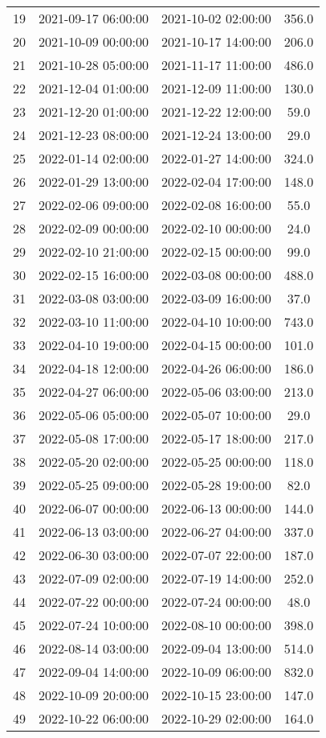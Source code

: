 \begin{center}
\begin{longtable}{|c|c|c|c|}
19 & 2021-09-17 06:00:00 & 2021-10-02 02:00:00 & 356.0\\ 
20 & 2021-10-09 00:00:00 & 2021-10-17 14:00:00 & 206.0\\ 
21 & 2021-10-28 05:00:00 & 2021-11-17 11:00:00 & 486.0\\ 
22 & 2021-12-04 01:00:00 & 2021-12-09 11:00:00 & 130.0\\ 
23 & 2021-12-20 01:00:00 & 2021-12-22 12:00:00 & 59.0\\ 
24 & 2021-12-23 08:00:00 & 2021-12-24 13:00:00 & 29.0\\ 
25 & 2022-01-14 02:00:00 & 2022-01-27 14:00:00 & 324.0\\ 
26 & 2022-01-29 13:00:00 & 2022-02-04 17:00:00 & 148.0\\ 
27 & 2022-02-06 09:00:00 & 2022-02-08 16:00:00 & 55.0\\ 
28 & 2022-02-09 00:00:00 & 2022-02-10 00:00:00 & 24.0\\ 
29 & 2022-02-10 21:00:00 & 2022-02-15 00:00:00 & 99.0\\ 
30 & 2022-02-15 16:00:00 & 2022-03-08 00:00:00 & 488.0\\ 
31 & 2022-03-08 03:00:00 & 2022-03-09 16:00:00 & 37.0\\ 
32 & 2022-03-10 11:00:00 & 2022-04-10 10:00:00 & 743.0\\ 
33 & 2022-04-10 19:00:00 & 2022-04-15 00:00:00 & 101.0\\ 
34 & 2022-04-18 12:00:00 & 2022-04-26 06:00:00 & 186.0\\ 
35 & 2022-04-27 06:00:00 & 2022-05-06 03:00:00 & 213.0\\ 
36 & 2022-05-06 05:00:00 & 2022-05-07 10:00:00 & 29.0\\ 
37 & 2022-05-08 17:00:00 & 2022-05-17 18:00:00 & 217.0\\ 
38 & 2022-05-20 02:00:00 & 2022-05-25 00:00:00 & 118.0\\ 
39 & 2022-05-25 09:00:00 & 2022-05-28 19:00:00 & 82.0\\ 
40 & 2022-06-07 00:00:00 & 2022-06-13 00:00:00 & 144.0\\ 
41 & 2022-06-13 03:00:00 & 2022-06-27 04:00:00 & 337.0\\ 
42 & 2022-06-30 03:00:00 & 2022-07-07 22:00:00 & 187.0\\ 
43 & 2022-07-09 02:00:00 & 2022-07-19 14:00:00 & 252.0\\ 
44 & 2022-07-22 00:00:00 & 2022-07-24 00:00:00 & 48.0\\ 
45 & 2022-07-24 10:00:00 & 2022-08-10 00:00:00 & 398.0\\ 
46 & 2022-08-14 03:00:00 & 2022-09-04 13:00:00 & 514.0\\ 
47 & 2022-09-04 14:00:00 & 2022-10-09 06:00:00 & 832.0\\ 
48 & 2022-10-09 20:00:00 & 2022-10-15 23:00:00 & 147.0\\ 
49 & 2022-10-22 06:00:00 & 2022-10-29 02:00:00 & 164.0\\ 
\hline
\end{longtable}
\end{center}